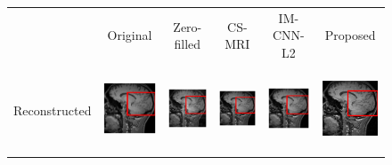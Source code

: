 \documentclass[review]{elsarticle}
\begin{document}
\begin{figure}[H]
	\begin{raggedleft}
		\hspace*{-2cm} \begin{tabular}{cccccc}
			& \multicolumn{1}{c}{\footnotesize Original} & {\footnotesize Zero-filled} & {\footnotesize CS-MRI} & {\footnotesize IM-CNN-L2} & {\footnotesize Proposed}\tabularnewline
			\multirow{1}{0.05cm}[1.8cm]{\begin{turn}{90} {\footnotesize Reconstructed} \end{turn}} &
			
			\includegraphics[width=2.5cm,height=2.5cm]{include/grp2/factor4/012-HH-1211-T1/012-HH-1211-T1_images__35} &
			\includegraphics[width=2.5cm,height=2.5cm]{include/grp2/factor4/012-HH-1211-T1/012-HH-1211-T1_images__zeroPadding_35} & \includegraphics[width=2.5cm,height=2.5cm]{include/grp2/factor4/012-HH-1211-T1/012-HH-1211-T1_images__CS_35} & \includegraphics[width=2.5cm,height=2.5cm]{include/grp2/factor4/012-HH-1211-T1/012-HH-1211-T1_images__IMCNNL2TUNE_35} & \includegraphics[width=2.5cm,height=2.5cm]{include/grp2/factor4/012-HH-1211-T1/012-HH-1211-T1_images__predict_35}
			

\end{tabular}
\end{raggedleft}
\end{figure}
\end{document}
